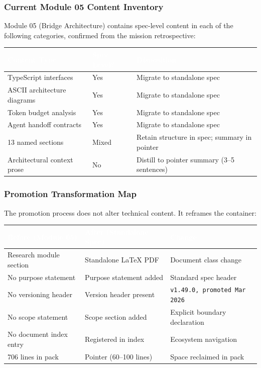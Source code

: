 \documentclass[11pt,letterpaper]{article}
\newcommand{\tableheader}[1]{\textbf{\sffamily\textcolor{white}{#1}}}
\begin{document}
\subsubsection{Current Module 05 Content Inventory}

Module 05 (Bridge Architecture) contains spec-level content in each of the following categories, confirmed from the mission retrospective:

\begin{center}
\begin{tabularx}{\textwidth}{L{4cm}L{2.5cm}X}
\toprule
{}
\tableheader{Content Type} & \tableheader{Spec Level?} & \tableheader{Disposition} \\
\midrule
TypeScript interfaces & Yes & Migrate to standalone spec \\
ASCII architecture diagrams & Yes & Migrate to standalone spec \\
Token budget analysis & Yes & Migrate to standalone spec \\
Agent handoff contracts & Yes & Migrate to standalone spec \\
13 named sections & Mixed & Retain structure in spec; summary in pointer \\
Architectural context prose & No & Distill to pointer summary (3--5 sentences) \\
\bottomrule
\end{tabularx}
\end{center}

\subsubsection{Promotion Transformation Map}

The promotion process does not alter technical content. It reframes the container:

\begin{center}
\begin{tabularx}{\textwidth}{L{3.5cm}L{3.5cm}X}
\toprule
{}
\tableheader{Before (Module 05)} & \tableheader{After (Standalone Spec)} & \tableheader{Change} \\
\midrule
Research module section & Standalone LaTeX PDF & Document class change \\
No purpose statement & Purpose statement added & Standard spec header \\
No versioning header & Version header present & \texttt{v1.49.0, promoted Mar 2026} \\
No scope statement & Scope section added & Explicit boundary declaration \\
No document index entry & Registered in index & Ecosystem navigation \\
706 lines in pack & Pointer (60--100 lines) & Space reclaimed in pack \\
\bottomrule
\end{tabularx}
\end{center}
\end{document}
